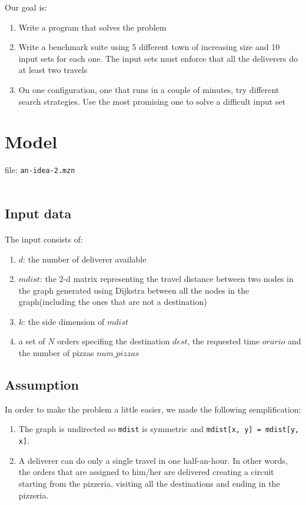 \documentclass[10pt]{article}
\begin{document}
	Our goal is:
	\begin{enumerate}
		\item Write a program that solves the problem
		\item Write a benchmark suite using 5 different town of increasing size
			and 10 input sets for each one. The input sets must enforce that all
			the deliverers do at least two travels
		\item On one configuration, one that runs in a couple of minutes, try
			different search strategies. Use the most promising one to solve a
			difficult input set
	\end{enumerate}

	\section{Model}

	file: \texttt{an-idea-2.mzn}\\~\
	
	\subsection{Input data}

	\paragraph*{}
	The input consists of:
	\begin{enumerate}
		\item $d$: the number of deliverer available
		\item $mdist$: the 2-d matrix representing the travel distance between
			two nodes in the graph generated using Dijkstra between all the nodes 
			in the graph(including the ones that are not a destination)
		\item $k$: the side dimension of $mdist$
		\item a set of $N$ orders specifing the destination $dest$, the requested 
			time $orario$ and the number of pizzas $num\_pizzas$
	\end{enumerate}

	\subsection{Assumption}
	In order to make the problem a little easier, we made the following 
	semplification:
	\begin{enumerate}
		\item The graph is undirected so \texttt{mdist}	is symmetric and 
			\texttt{mdist[x, y] = mdist[y, x]}.
		\item A deliverer can do only a single travel in one half-an-hour. In other
			words, the orders that are assigned to him/her are delivered creating 
			a circuit starting from the pizzeria, visiting all the destinations 
			and ending in the pizzeria.
	\end{enumerate}
\end{document}
